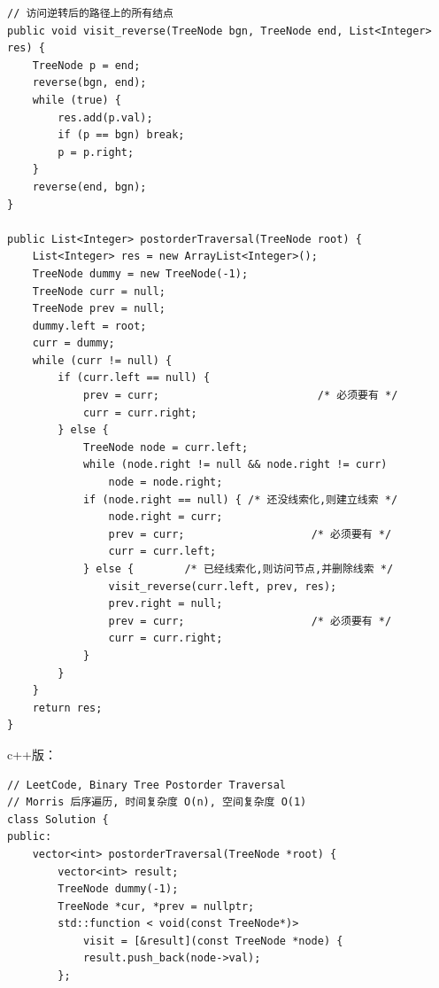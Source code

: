\documentclass[12pt]{book}
\begin{document}
\begin{enumerate}
\begin{lstlisting}
// 访问逆转后的路径上的所有结点
public void visit_reverse(TreeNode bgn, TreeNode end, List<Integer> res) {
    TreeNode p = end;
    reverse(bgn, end);
    while (true) {
        res.add(p.val);
        if (p == bgn) break;
        p = p.right;
    }
    reverse(end, bgn);
}
        
public List<Integer> postorderTraversal(TreeNode root) {
    List<Integer> res = new ArrayList<Integer>();
    TreeNode dummy = new TreeNode(-1);
    TreeNode curr = null;
    TreeNode prev = null;
    dummy.left = root;
    curr = dummy;
    while (curr != null) {
        if (curr.left == null) {
            prev = curr;                         /* 必须要有 */
            curr = curr.right;
        } else {
            TreeNode node = curr.left;
            while (node.right != null && node.right != curr)
                node = node.right;
            if (node.right == null) { /* 还没线索化,则建立线索 */
                node.right = curr;
                prev = curr;                    /* 必须要有 */
                curr = curr.left;
            } else {        /* 已经线索化,则访问节点,并删除线索 */
                visit_reverse(curr.left, prev, res);
                prev.right = null;
                prev = curr;                    /* 必须要有 */
                curr = curr.right;
            }
        }
    }
    return res;
}
\end{lstlisting}

c++版：

\lstset{language=java,label= ,caption= ,numbers=none}
\begin{lstlisting}
// LeetCode, Binary Tree Postorder Traversal
// Morris 后序遍历, 时间复杂度 O(n), 空间复杂度 O(1)
class Solution {
public:
    vector<int> postorderTraversal(TreeNode *root) {
        vector<int> result;
        TreeNode dummy(-1);
        TreeNode *cur, *prev = nullptr;
        std::function < void(const TreeNode*)>
            visit = [&result](const TreeNode *node) {
            result.push_back(node->val);
        };


\end{lstlisting}
\end{enumerate}
\end{document}
